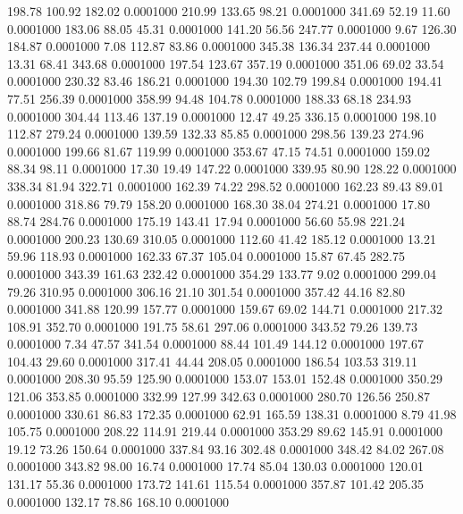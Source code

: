  198.78  100.92  182.02   0.0001000
 210.99  133.65   98.21   0.0001000
 341.69   52.19   11.60   0.0001000
 183.06   88.05   45.31   0.0001000
 141.20   56.56  247.77   0.0001000
   9.67  126.30  184.87   0.0001000
   7.08  112.87   83.86   0.0001000
 345.38  136.34  237.44   0.0001000
  13.31   68.41  343.68   0.0001000
 197.54  123.67  357.19   0.0001000
 351.06   69.02   33.54   0.0001000
 230.32   83.46  186.21   0.0001000
 194.30  102.79  199.84   0.0001000
 194.41   77.51  256.39   0.0001000
 358.99   94.48  104.78   0.0001000
 188.33   68.18  234.93   0.0001000
 304.44  113.46  137.19   0.0001000
  12.47   49.25  336.15   0.0001000
 198.10  112.87  279.24   0.0001000
 139.59  132.33   85.85   0.0001000
 298.56  139.23  274.96   0.0001000
 199.66   81.67  119.99   0.0001000
 353.67   47.15   74.51   0.0001000
 159.02   88.34   98.11   0.0001000
  17.30   19.49  147.22   0.0001000
 339.95   80.90  128.22   0.0001000
 338.34   81.94  322.71   0.0001000
 162.39   74.22  298.52   0.0001000
 162.23   89.43   89.01   0.0001000
 318.86   79.79  158.20   0.0001000
 168.30   38.04  274.21   0.0001000
  17.80   88.74  284.76   0.0001000
 175.19  143.41   17.94   0.0001000
  56.60   55.98  221.24   0.0001000
 200.23  130.69  310.05   0.0001000
 112.60   41.42  185.12   0.0001000
  13.21   59.96  118.93   0.0001000
 162.33   67.37  105.04   0.0001000
  15.87   67.45  282.75   0.0001000
 343.39  161.63  232.42   0.0001000
 354.29  133.77    9.02   0.0001000
 299.04   79.26  310.95   0.0001000
 306.16   21.10  301.54   0.0001000
 357.42   44.16   82.80   0.0001000
 341.88  120.99  157.77   0.0001000
 159.67   69.02  144.71   0.0001000
 217.32  108.91  352.70   0.0001000
 191.75   58.61  297.06   0.0001000
 343.52   79.26  139.73   0.0001000
   7.34   47.57  341.54   0.0001000
  88.44  101.49  144.12   0.0001000
 197.67  104.43   29.60   0.0001000
 317.41   44.44  208.05   0.0001000
 186.54  103.53  319.11   0.0001000
 208.30   95.59  125.90   0.0001000
 153.07  153.01  152.48   0.0001000
 350.29  121.06  353.85   0.0001000
 332.99  127.99  342.63   0.0001000
 280.70  126.56  250.87   0.0001000
 330.61   86.83  172.35   0.0001000
  62.91  165.59  138.31   0.0001000
   8.79   41.98  105.75   0.0001000
 208.22  114.91  219.44   0.0001000
 353.29   89.62  145.91   0.0001000
  19.12   73.26  150.64   0.0001000
 337.84   93.16  302.48   0.0001000
 348.42   84.02  267.08   0.0001000
 343.82   98.00   16.74   0.0001000
  17.74   85.04  130.03   0.0001000
 120.01  131.17   55.36   0.0001000
 173.72  141.61  115.54   0.0001000
 357.87  101.42  205.35   0.0001000
 132.17   78.86  168.10   0.0001000

